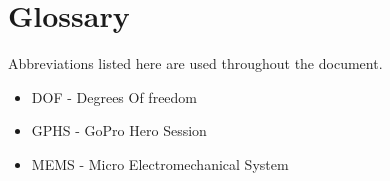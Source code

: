 \chapter*{Glossary}

Abbreviations listed here are used throughout the document.

\begin{itemize}

\item DOF - Degrees Of freedom
\item GPHS - GoPro Hero Session
\item MEMS - Micro Electromechanical System


\end{itemize}
